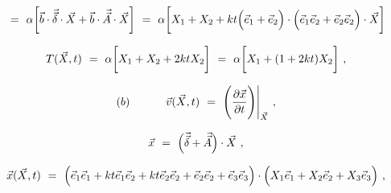 \documentclass{article}
\begin{document}
\begin{equation} \label{eq:1}
\hspace{0.125cm} = \hspace{0.125cm} \alpha \bigg[ \vec{b} \cdot \vec{\vec{\delta}} \cdot \vec{X} + \vec{b} \cdot \vec{\vec{A}} \cdot \vec{X} \bigg] \hspace{0.125cm} =  \hspace{0.125cm} \alpha \bigg[ X_1 + X_2 + k t \Big( \vec{e}_1 + \vec{e}_2 \Big)  \cdot \Big( \vec{e}_1 \vec{e}_2 + \vec{e}_2 \vec{e}_2 \Big) \cdot \vec{X} \bigg]
\end{equation}

\begin{equation} \label{eq:1}
T( \vec{X} , t ) \hspace{0.125cm} = \hspace{0.125cm} \alpha \bigg[ X_1 + X_2 + 2 k t  X_2 \bigg] \hspace{0.125cm} = \hspace{0.125cm} \alpha \bigg[ X_1 + (1 + 2 k t) X_2 \bigg] \hspace{0.125cm} ,
\end{equation}

\begin{equation} \label{eq:1}
(b) \hspace{1.125cm} \vec{v}( \vec{X} , t ) \hspace{0.125cm} = \hspace{0.125cm} \Bigg( \frac{ \partial{\vec{x}}}{\partial{t}} \Bigg) \Bigg|_{\vec{X}} \hspace{0.125cm} , 
\end{equation}

\begin{equation} \label{eq:1}
\vec{x} \hspace{0.125cm} = \hspace{0.125cm} \Big( \vec{\vec{\delta}} + \vec{\vec{A}} \Big) \cdot \vec{X} \hspace{0.125cm} , 
\end{equation}

\begin{equation} \label{eq:1}
\vec{x}( \vec{X} , t ) \hspace{0.125cm} = \hspace{0.125cm} \Big( \vec{e}_1 \vec{e}_1 + k t \vec{e}_1 \vec{e}_2 + k t \vec{e}_2 \vec{e}_2 + \vec{e}_2 \vec{e}_2 + \vec{e}_3 \vec{e}_3 \Big) \cdot \Big( X_1 \vec{e}_1 + X_2 \vec{e}_2  + X_3 \vec{e}_3 \Big) \hspace{0.125cm} , 
\end{equation}
\end{document}

